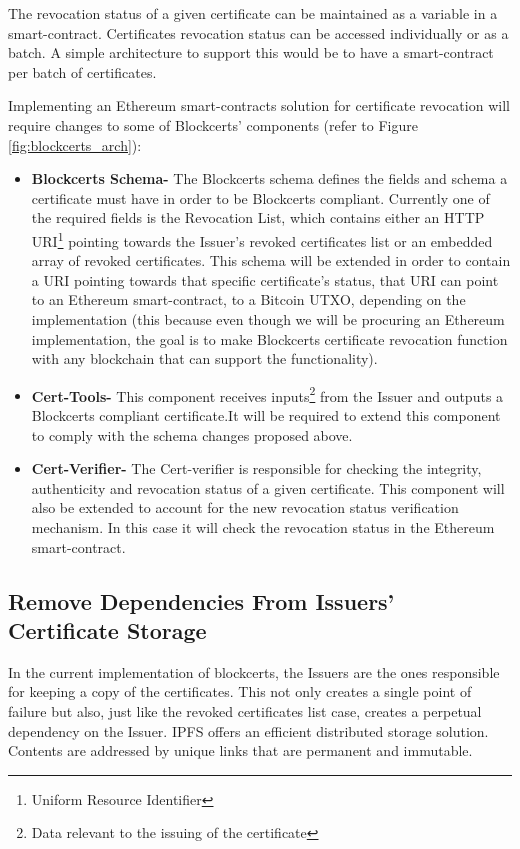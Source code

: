 \documentclass[llncsdoc]{llncs}
\begin{document}
The revocation status of a given certificate can be maintained as a variable in a smart-contract. Certificates revocation status can be accessed individually or as a batch. A simple architecture to support this would be to have a smart-contract per batch of certificates. 

Implementing an Ethereum smart-contracts solution for certificate revocation will require changes to some of Blockcerts' components (refer to Figure \ref{fig:blockcerts_arch}):
\begin{itemize}
    \item \textbf{Blockcerts Schema-} The Blockcerts schema defines the fields and schema a certificate must have in order to be Blockcerts compliant. Currently one of the required fields is the Revocation List, which contains either an HTTP URI\footnote{Uniform Resource Identifier} pointing towards the Issuer's revoked certificates list or an embedded array of revoked certificates. This schema will be extended in order to contain a URI pointing towards that specific certificate's status, that URI can point to an Ethereum smart-contract, to a Bitcoin UTXO, depending on the implementation (this because even though we will be procuring an Ethereum implementation, the goal is to make Blockcerts certificate revocation function with any blockchain that can support the functionality).
    
    \item \textbf{Cert-Tools-} This component receives inputs\footnote{Data relevant to the issuing of the certificate} from the Issuer and outputs a Blockcerts compliant certificate.It will be required to extend this component to comply with the schema changes proposed above.
    \item \textbf{Cert-Verifier-} The Cert-verifier is responsible for checking the integrity, authenticity and revocation status of a given certificate. This component will also be extended to account for the new revocation status verification mechanism. In this case it will check the revocation status in the Ethereum smart-contract.
\end{itemize}

\subsection{Remove Dependencies From Issuers' Certificate Storage}
In the current implementation of blockcerts, the Issuers are the ones responsible for keeping a copy of the certificates. This not only creates a single point of failure but also, just like the revoked certificates list case, creates a perpetual dependency on the Issuer. IPFS offers an efficient distributed storage solution. Contents are addressed by unique links that are permanent and immutable.
\end{document}
